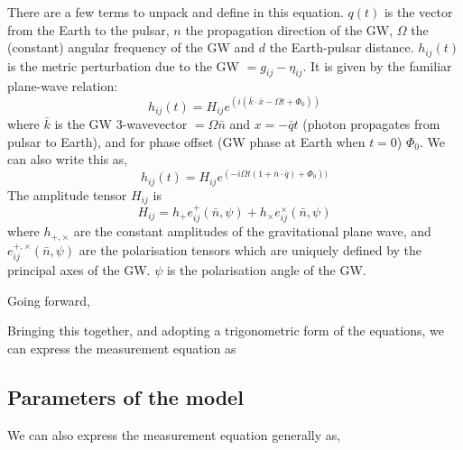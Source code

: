 \documentclass[fleqn,usenatbib,useAMS]{mnras}
\begin{document}
There are a few terms to unpack and define in this equation. $q(t)$ is the vector from the Earth to the pulsar, $n$ the propagation direction of the GW, $\Omega$ the (constant) angular frequency of the GW and $d$ the Earth-pulsar distance. $h_{ij}(t)$ is the metric perturbation due to the GW $= g_{ij} - \eta_{ij}$. It is given by the familiar plane-wave relation:	
\begin{equation}
	h_{ij}(t) = H_{ij} e^{(i(\bar{k} \cdot \bar{x} - \Omega t + \Phi_0))}
\end{equation}
where $\bar{k}$ is the GW 3-wavevector $=\Omega \bar{n}$ and $x = -\bar{q} t$ (photon propagates from pulsar to Earth), and for phase offset (GW phase at Earth when $t=0$) $\Phi_0$.  We can also write this as,
\begin{equation}
h_{ij}(t) = H_{ij} e^{(-i\Omega t (1 + \bar{n} \cdot \bar{q} ) + \Phi_0))}
\end{equation}
The amplitude tensor  $H_{ij}$ is
\begin{equation}
	H_{ij} = h_+ e_{ij}^+(\bar{n},\psi) + h_{\times} e_{ij}^{\times}(\bar{n},\psi)
\end{equation}
where $h_{+,\times}$ are the constant amplitudes of the gravitational plane wave, and $e_{ij}^{+, \times}(\bar{n}, \psi)$ are the polarisation tensors which are uniquely defined by the principal axes of the GW. $\psi$ is the polarisation angle of the GW. \newline 








\noindent Going forward,  \newline 




\noindent Bringing this together, and adopting a trigonometric form of the equations, we can express the measurement equation as 






\subsection{Parameters of the model}
\noindent 



We can also express the measurement equation generally as,
\end{document}
